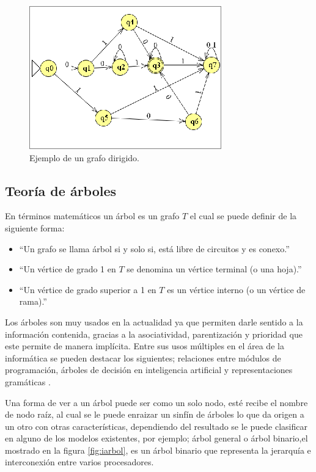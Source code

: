\begin{figure}[h]
\centering
\includegraphics[width=0.8\columnwidth]{chap3/Imagenes/GrafoDirigido.eps}
\caption{Ejemplo de un grafo dirigido.}
\label{fig:igrafoD}
\end{figure}


\subsection{Teor\'ia de \'arboles}
En t\'erminos matem\'aticos un \'arbol es un grafo $T$ el cual se puede definir
 de la siguiente forma\cite{SUSANNAS.EPP2012}:

\begin{itemize}
	\item ``Un grafo se llama \'arbol si y solo si, est\'a libre de circuitos y
	 es conexo.''
	\item ``Un v\'ertice de grado 1 en $T$ se denomina un v\'ertice terminal (o
	 una hoja).''
	\item ``Un v\'ertice de grado superior a 1 en $T$ es un v\'ertice interno 
	(o un v\'ertice de rama).''
\end{itemize}


Los \'arboles son muy usados en la actualidad ya que permiten  darle sentido a
 la informaci\'on contenida, gracias a la asociatividad, parentizaci\'on y
 prioridad que este permite de manera impl\'icita. Entre sus usos m\'ultiples 
 en el \'area de la inform\'atica se pueden destacar los  siguientes; 
 relaciones entre m\'odulos de programaci\'on, \'arboles de decisi\'on en 
 inteligencia artificial y representaciones gram\'aticas
 \cite{gutierrez1999estructuras}.  

Una forma de ver a un \'arbol puede ser como un solo nodo, est\'e recibe el 
 nombre de  nodo ra\'iz, al cual se le puede enraizar un sinf\'in de \'arboles 
 lo que da origen a un otro con otras caracter\'isticas, dependiendo del 
 resultado se le puede clasificar en alguno de los modelos existentes, por 
 ejemplo; \'arbol  general o \'arbol binario\cite{gutierrez1999estructuras},el 
 mostrado en la figura \ref{fig:iarbol}, es un \'arbol binario que representa 
 la jerarqu\'ia e interconexi\'on entre varios procesadores. 

